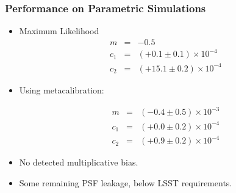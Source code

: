 \documentclass{beamer}
\newcommand{\mcal}{metacalibration}
\begin{document}
\frame
{
    \frametitle{Performance on Parametric Simulations}

 
    \begin{itemize}


        \item Maximum Likelihood 
            {\color{brightred} 
                \begin{eqnarray}
                    m & = & -0.5  \nonumber \\
                  c_1 & = & (+0.1 \pm 0.1) \times 10^{-4} \nonumber \\
                  c_2 & = & (+15.1 \pm 0.2) \times 10^{-4} \nonumber
                \end{eqnarray}
            }


        \item Using \mcal:

            {\color{gold} 
                \begin{eqnarray}
                    m & = & (-0.4 \pm 0.5) \times 10^{-3} \nonumber \\
                  c_1 & = & (+0.0 \pm 0.2) \times 10^{-4} \nonumber \\
                  c_2 & = & (+0.9 \pm 0.2) \times 10^{-4} \nonumber
                \end{eqnarray}
            }

        \item No detected multiplicative bias.
        \item Some remaining PSF leakage, below LSST requirements.

    \end{itemize}

}
\end{document}
